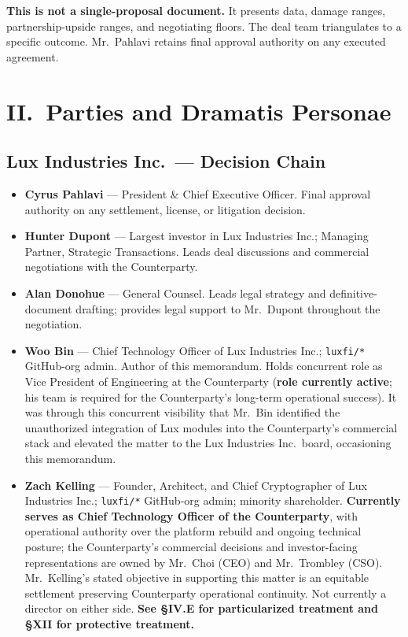 \documentclass[11pt,letterpaper]{article}
\begin{document}
\textbf{This is not a single-proposal document.} It presents data,
damage ranges, partnership-upside ranges, and negotiating floors.
The deal team triangulates to a specific outcome. Mr.\ Pahlavi
retains final approval authority on any executed agreement.

\section*{II.\ Parties and Dramatis Personae}

\subsection*{Lux Industries Inc.\ --- Decision Chain}

\begin{itemize}[leftmargin=1.5em,itemsep=0.2em]
\item \textbf{Cyrus Pahlavi} --- President \& Chief Executive Officer.
Final approval authority on any settlement, license, or litigation
decision.
\item \textbf{Hunter Dupont} --- Largest investor in Lux Industries
Inc.; Managing Partner, Strategic Transactions. Leads deal discussions
and commercial negotiations with the Counterparty.
\item \textbf{Alan Donohue} --- General Counsel. Leads legal strategy
and definitive-document drafting; provides legal support to Mr.\
Dupont throughout the negotiation.
\item \textbf{Woo Bin} --- Chief Technology Officer of Lux Industries
Inc.; \texttt{luxfi/*} GitHub-org admin. Author of this memorandum.
Holds concurrent role as Vice President of Engineering at the
Counterparty (\textbf{role currently active}; his team is required
for the Counterparty's long-term operational success). It was through
this concurrent visibility that Mr.\ Bin identified the unauthorized
integration of Lux modules into the Counterparty's commercial stack
and elevated the matter to the Lux Industries Inc.\ board, occasioning
this memorandum.
\item \textbf{Zach Kelling} --- Founder, Architect, and Chief
Cryptographer of Lux Industries Inc.; \texttt{luxfi/*} GitHub-org
admin; minority shareholder. \textbf{Currently serves as Chief
Technology Officer of the Counterparty}, with operational authority
over the platform rebuild and ongoing technical posture; the
Counterparty's commercial decisions and investor-facing
representations are owned by Mr.\ Choi (CEO) and Mr.\ Trombley (CSO).
Mr.\ Kelling's stated objective in supporting this matter is an
equitable settlement preserving Counterparty operational continuity.
Not currently a director on either side. \textbf{See \S IV.E for
particularized treatment and \S XII for protective treatment.}
\end{itemize}
\end{document}
